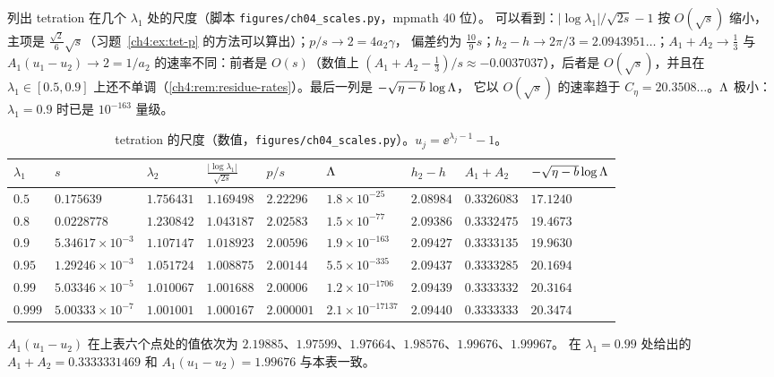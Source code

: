 \begin{example}[数值]\label{ch4:exa:numbers}
 列出 tetration 在几个 $\lambda_1$ 处的尺度（脚本 \texttt{figures/ch04\_scales.py}，mpmath 40 位）。
可以看到：$|\log\lambda_1|/\sqrt{2s}-1$ 按 $O(\sqrt s)$ 缩小，主项是 $\frac{\sqrt2}6\sqrt s$（习题~\ref{ch4:ex:tet-p} 的方法可以算出）；$p/s\to2=4a_2\gamma$，
偏差约为 $\frac{10}9s$；$h_2-h\to2\pi/3=2.0943951\ldots$；$A_1+A_2\to\frac13$ 与 $A_1(u_1-u_2)\to2=1/a_2$
的速率不同：前者是 $O(s)$（数值上 $(A_1+A_2-\frac13)/s\approx-0.0037037$），后者是 $O(\sqrt s)$，并且在 $\lambda_1\in[0.5,0.9]$ 上还不单调（\cref{ch4:rem:residue-rates}）。最后一列是 $-\sqrt{\eta-b}\,\log\Lambda$，
它以 $O(\sqrt s)$ 的速率趋于 $C_\eta=20.3508\ldots$。$\Lambda$ 极小：$\lambda_1=0.9$ 时已是 $10^{-163}$ 量级。
\end{example}

\begin{table}[htbp]
\centering
\caption{tetration 的尺度（数值，\texttt{figures/ch04\_scales.py}）。$u_j=\ee^{\lambda_j-1}-1$。}
\label{ch4:tab:tet}
\small\setlength{\tabcolsep}{2.5pt}
\begin{tabular}{lllllllll}
\toprule
$\lambda_1$ & $s$ & $\lambda_2$ & $\frac{|\log\lambda_1|}{\sqrt{2s}}$ & $p/s$ & $\Lambda$ & $h_2-h$ & $A_1+A_2$ & $-\sqrt{\eta-b}\log\Lambda$\\
\midrule
$0.5$ & $0.175639$ & $1.756431$ & $1.169498$ & $2.22296$ & $1.8\times10^{-25}$ & $2.08984$ & $0.3326083$ & $17.1240$\\
$0.8$ & $0.0228778$ & $1.230842$ & $1.043187$ & $2.02583$ & $1.5\times10^{-77}$ & $2.09386$ & $0.3332475$ & $19.4673$\\
$0.9$ & $5.34617\times10^{-3}$ & $1.107147$ & $1.018923$ & $2.00596$ & $1.9\times10^{-163}$ & $2.09427$ & $0.3333135$ & $19.9630$\\
$0.95$ & $1.29246\times10^{-3}$ & $1.051724$ & $1.008875$ & $2.00144$ & $5.5\times10^{-335}$ & $2.09437$ & $0.3333285$ & $20.1694$\\
$0.99$ & $5.03346\times10^{-5}$ & $1.010067$ & $1.001688$ & $2.00006$ & $1.2\times10^{-1706}$ & $2.09439$ & $0.3333332$ & $20.3164$\\
$0.999$ & $5.00333\times10^{-7}$ & $1.001001$ & $1.000167$ & $2.000001$ & $2.1\times10^{-17137}$ & $2.09440$ & $0.3333333$ & $20.3474$\\
\bottomrule
\end{tabular}
\end{table}

$A_1(u_1-u_2)$ 在上表六个点处的值依次为 $2.19885$、$1.97599$、$1.97664$、$1.98576$、$1.99676$、$1.99967$。
\cite{KneserPaper} 在 $\lambda_1=0.99$ 处给出的 $A_1+A_2=0.3333331469$ 和 $A_1(u_1-u_2)=1.99676$ 与本表一致。

